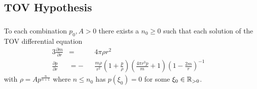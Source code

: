 \subsection{TOV Hypothesis}
\begin{frame}
	\frametitle{\insertsubsection}
	\begin{theorem}
		To each combination $p_0,A>0$ there exists a $n_0\geq0$ such that each solution of the TOV differential equation
		\begin{alignat*}{3}
			\frac{\partial m}{\partial r} &= &&4\pi\rho r^2\\
			\frac{\partial p}{\partial r} &= -&&\frac{m\rho}{r^2}\left(1+\frac{p}{\rho}\right)\left(\frac{4\pi r^3p}{m}+1\right)\left(1-\frac{2m}{r}\right)^{-1}
		\end{alignat*}
		with $\rho=Ap^{\frac{n}{n+1}}$ where $n\leq n_0$ has $p(\xi_0)=0$ for some $\xi_0\in\mathbb{R}_{>0}$.
	\end{theorem}
\end{frame}


% 		
